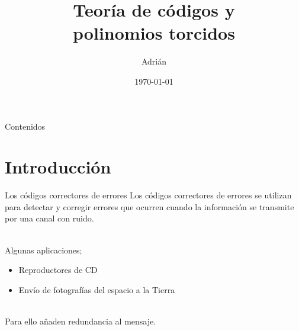 \documentclass[aspectratio=43,14pt,spanish]{beamer}
\title[Teoría de Códigos]{Teoría de códigos y \\ polinomios torcidos}
\author[A.]{Adrián}
\institute[UGR]{Universidad de Granada}
\date{\today}
\theoremstyle{definition} %
\begin{document}
    \titlepage

    \begin{frame}[t]{Contenidos}
        \tableofcontents
    \end{frame}



    \section{Introducción}
    \begin{frame}{Los códigos correctores de errores}
        Los códigos correctores de errores se utilizan para detectar y corregir errores que ocurren cuando la información se transmite por una canal con ruido.

        \ \\

        Algunas aplicaciones;

        \begin{itemize}
            \item Reproductores de CD
            \item Envío de fotografías del espacio a la Tierra
        \end{itemize}

        \ \\

        Para ello añaden redundancia al mensaje.
    \end{frame}
\end{document}
